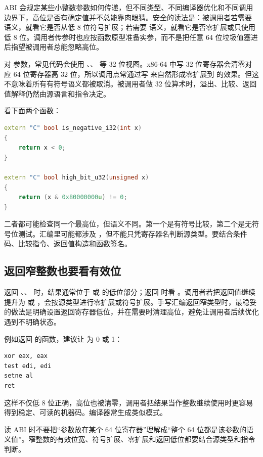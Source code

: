 ABI 会规定某些小整数参数如何传递，但不同类型、不同编译器优化和不同调用边界下，高位是否有确定值并不总能靠肉眼猜。安全的读法是：被调用者若需要  语义，就看它是否从低 8 位符号扩展；若需要  语义，就看它是否零扩展或只使用低 8 位。调用者传参时也应按函数原型准备实参，而不是把任意 64 位垃圾值塞进  后指望被调用者总能忽略高位。

对  参数，常见代码会使用 、、 等 32 位视图。x86-64 中写 32 位寄存器会清零对应 64 位寄存器高 32 位，所以调用点常通过写  来自然形成零扩展到  的效果。但这不意味着所有有符号语义都被取消。被调用者做 32 位算术时，溢出、比较、返回值解释仍然由源语言和指令决定。

看下面两个函数：

\begin{lstlisting}[language=C++]
extern "C" bool is_negative_i32(int x)
{
    return x < 0;
}

extern "C" bool high_bit_u32(unsigned x)
{
    return (x & 0x80000000u) != 0;
}
\end{lstlisting}

二者都可能检查同一个最高位，但语义不同。第一个是有符号比较，第二个是无符号位测试。汇编里可能都涉及 ，但不能只凭寄存器名判断源类型。要结合条件码、比较指令、返回值构造和函数签名。

\subsection{返回窄整数也要看有效位}

返回 、、 时，结果通常位于  或  的低位部分；返回  时看 。调用者若把返回值继续提升为  或 ，会按源类型进行零扩展或符号扩展。手写汇编返回窄类型时，最稳妥的做法是明确设置返回寄存器低位，并在需要时清理高位，避免让调用者后续优化遇到不明确状态。

例如返回  的函数，建议让  为 0 或 1：

\begin{lstlisting}
xor eax, eax
test edi, edi
setne al
ret
\end{lstlisting}

这样不仅低 8 位正确，高位也被清零，调用者把结果当作整数继续使用时更容易得到稳定、可读的机器码。编译器常生成类似模式。

\begin{warningbox}
读 ABI 时不要把“参数放在某个 64 位寄存器”理解成“整个 64 位都是该参数的语义值”。窄整数的有效位宽、符号扩展、零扩展和返回低位都要结合源类型和指令判断。
\end{warningbox}

